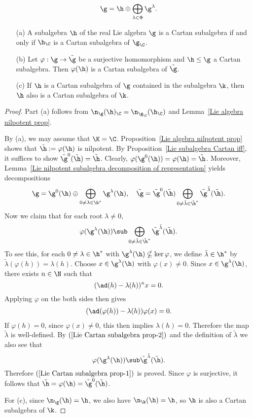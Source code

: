 \[\g=\h\oplus\bigoplus_{\lambda\in\Phi}\g^{\lambda}.\]
\begin{proposition}\label{Lie Cartan subalgebra prop}
\mbox{}
\begin{itemize}
\item[(a)] A subalgebra $\h$ of the real Lie algebra $\g$ is a Cartan subalgebra if and only if $\h_{\C}$ is a Cartan subalgebra of $\g_{\C}$.
\item[(b)] Let $\varphi:\g\to\tilde{\g}$ be a surjective homomorphism and $\h\leq\g$ a Cartan subalgebra. Then $\varphi(\h)$ is a Cartan subalgebra of $\tilde{\g}$.
\item[(c)] If $\h$ is a Cartan subalgebra of $\g$ contained in the subalgebra $\k$, then $\h$ also is a Cartan subalgebra of $\k$.
\end{itemize}
\end{proposition}
\begin{proof}
Part (a) follows from $\n_{\g}(\h)_{\C}=\n_{\g_{\C}}(\h_{\C})$ and Lemma~\ref{Lie algebra nilpotent prop}.\par
By (a), we may assume that $\K=\C$. Proposition~\ref{Lie algebra nilpotent prop} shows that $\tilde{\h}:=\varphi(\h)$ is nilpotent. By Proposition~\ref{Lie subalgebra Cartan iff}, it suffices to show $\tilde{\g}^0(\tilde{\h})=\tilde{\h}$. Clearly, $\varphi(\g^0(\h))=\varphi(\h)=\tilde{\h}$. Moreover, Lemma~\ref{Lie nilpotent subalgebra decomposition of representation} yields decompositions
\[\g=\g^0(\h)\oplus\bigoplus_{0\neq\lambda\in\h^*}\g^{\lambda}(\h),\quad\tilde{\g}=\tilde{\g}^0(\tilde{\h})\bigoplus_{0\neq\tilde{\lambda}\in\tilde{\h}^*}\tilde{\g}^{\tilde{\lambda}}(\tilde{\h}).\]
Now we claim that for each root $\lambda\neq 0$,
\begin{align}\label{Lie Cartan subalgebra prop-1}
\varphi(\g^{\lambda}(\h))\sub\bigoplus_{0\neq\tilde{\lambda}\in\tilde{\h}^*}\tilde{\g}^{\tilde{\lambda}}(\tilde{\h}).
\end{align}
To see this, for each $0\neq\lambda\in\h^*$ with $\g^{\lambda}(\h)\nsubseteq\ker\varphi$, we define $\tilde{\lambda}\in\h^*$ by $\tilde{\lambda}(\varphi(h))=\lambda(h)$. Choose $x\in\g^{\lambda}(\h)$ with $\varphi(x)\neq 0$. Since $x\in\g^{\lambda}(\h)$, there exists $n\in\N$ such that
\[(\ad(h)-\lambda(h))^nx=0.\]
Applying $\varphi$ on the both sides then gives
\begin{align}\label{Lie Cartan subalgebra prop-2}
(\ad(\varphi(h))-\lambda(h))\varphi(x)=0.
\end{align}
If $\varphi(h)=0$, since $\varphi(x)\neq 0$, this then implies $\lambda(h)=0$. Therefore the map $\tilde{\lambda}$ is well-defined. By $(\ref{Lie Cartan subalgebra prop-2})$ and the definition of $\tilde{\lambda}$ we also see that
\[\varphi(\g^{\lambda}(\h))\sub\tilde{\g}^{\tilde{\lambda}}(\tilde{\h}).\]
Therefore $(\ref{Lie Cartan subalgebra prop-1})$ is proved. Since $\varphi$ is surjective, it follows that $\tilde{\h}=\varphi(\h)=\tilde{\g}^0(\tilde{\h})$.\par
For (c), since $\n_{\g}(\h)=\h$, we also have $\n_{\k}(\h)=\h$, so $\h$ is also a Cartan subalgebra of $\k$.
\end{proof}

